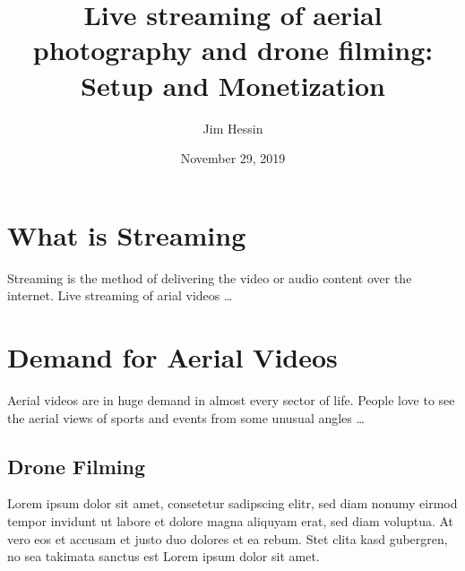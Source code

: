 \documentclass[letterpaper,12pt]{article}
\title{Live streaming of aerial photography and drone filming: Setup and
Monetization}
\author{Jim Hessin}
\date{November 29, 2019}
\begin{document}
  \maketitle
  \section*{What is Streaming}
  Streaming is the method of delivering the video or audio content over the
  internet. Live streaming of arial videos \ldots
  \section{Demand for Aerial Videos}
  Aerial videos are in huge demand in almost every sector of life. People love
  to see the aerial views of sports and events from some unusual angles \ldots
  \subsection{Drone Filming}
  
Lorem ipsum dolor sit amet, consetetur sadipscing elitr, sed diam nonumy eirmod tempor invidunt ut labore et dolore magna aliquyam erat, sed diam voluptua. At vero eos et accusam et justo duo dolores et ea rebum. Stet clita kasd gubergren, no sea takimata sanctus est Lorem ipsum dolor sit amet.
\end{document}
